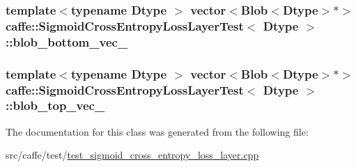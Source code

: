 \hypertarget{classcaffe_1_1_sigmoid_cross_entropy_loss_layer_test_a0361babc3565e93e60335f047d092fd9}{
\subsubsection[{blob\+\_\+bottom\+\_\+vec\+\_\+}]{\setlength{\rightskip}{0pt plus 5cm}template$<$typename Dtype $>$ vector$<${\bf Blob}$<$Dtype$>$$\ast$$>$ {\bf caffe\+::\+Sigmoid\+Cross\+Entropy\+Loss\+Layer\+Test}$<$ Dtype $>$\+::blob\+\_\+bottom\+\_\+vec\+\_\+\hspace{0.3cm}{\ttfamily [protected]}}}\label{classcaffe_1_1_sigmoid_cross_entropy_loss_layer_test_a0361babc3565e93e60335f047d092fd9}
\hypertarget{classcaffe_1_1_sigmoid_cross_entropy_loss_layer_test_ab38651b1211dc5fec113f7ad70f65221}{
\subsubsection[{blob\+\_\+top\+\_\+vec\+\_\+}]{\setlength{\rightskip}{0pt plus 5cm}template$<$typename Dtype $>$ vector$<${\bf Blob}$<$Dtype$>$$\ast$$>$ {\bf caffe\+::\+Sigmoid\+Cross\+Entropy\+Loss\+Layer\+Test}$<$ Dtype $>$\+::blob\+\_\+top\+\_\+vec\+\_\+\hspace{0.3cm}{\ttfamily [protected]}}}\label{classcaffe_1_1_sigmoid_cross_entropy_loss_layer_test_ab38651b1211dc5fec113f7ad70f65221}


The documentation for this class was generated from the following file\+:\begin{DoxyCompactItemize}
\item 
src/caffe/test/\hyperlink{test__sigmoid__cross__entropy__loss__layer_8cpp}{test\+\_\+sigmoid\+\_\+cross\+\_\+entropy\+\_\+loss\+\_\+layer.\+cpp}\end{DoxyCompactItemize}
